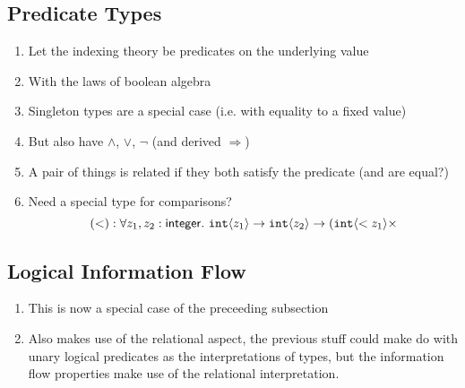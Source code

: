 \subsection{Predicate Types}
\label{sec:predicate-types}

\begin{enumerate}
\item Let the indexing theory be predicates on the underlying value
\item With the laws of boolean algebra
\item Singleton types are a special case (i.e. with equality to a fixed value)
\item But also have $\land$, $\lor$, $\lnot$ (and derived $\Rightarrow$)
\item A pair of things is related if they both satisfy the predicate
  (and are equal?)
\item Need a special type for comparisons?
  \begin{displaymath}
    (<) : \forall z_1,z_2:\mathsf{integer}.\ \tyPrim{int}{z_1} \to \tyPrim{int}{z_2} \to (\tyPrim{int}{< z_1} \times 
  \end{displaymath}
\end{enumerate}

\subsection{Logical Information Flow}
\label{sec:information-flow}

\begin{enumerate}
\item This is now a special case of the preceeding subsection
\item Also makes use of the relational aspect, the previous stuff
  could make do with unary logical predicates as the interpretations
  of types, but the information flow properties make use of the
  relational interpretation.
\end{enumerate}


